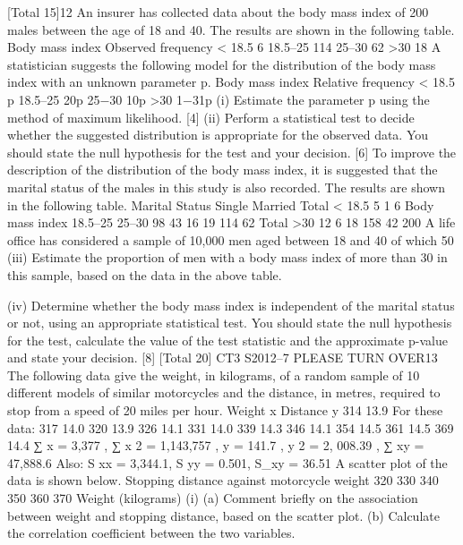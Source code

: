 \documentclass[a4paper,12pt]{article}
\begin{document}
\begin{enumerate}

[Total 15]12
An insurer has collected data about the body mass index of 200 males between the
age of 18 and 40. The results are shown in the following table.
Body mass index
Observed frequency
< 18.5
6
18.5–25
114
25–30
62
>30
18
A statistician suggests the following model for the distribution of the body mass index
with an unknown parameter p.
Body mass index
Relative frequency
< 18.5
p
18.5–25
20p
25−30
10p
>30
1−31p
(i) Estimate the parameter p using the method of maximum likelihood.
[4]
(ii) Perform a statistical test to decide whether the suggested distribution is
appropriate for the observed data. You should state the null hypothesis for the
test and your decision.
[6]
To improve the description of the distribution of the body mass index, it is suggested
that the marital status of the males in this study is also recorded. The results are
shown in the following table.
Marital Status
Single
Married
Total
< 18.5
5
1
6
Body mass index
18.5–25
25–30
98
43
16
19
114
62
Total
>30
12
6
18
158
42
200
A life office has considered a sample of 10,000 men aged between 18 and 40 of which
50%
(iii) Estimate the proportion of men with a body mass index of more than 30 in this
sample, based on the data in the above table.

(iv) Determine whether the body mass index is independent of the marital status or
not, using an appropriate statistical test. You should state the null hypothesis
for the test, calculate the value of the test statistic and the approximate
p-value and state your decision.
[8]
[Total 20]
CT3 S2012–7
PLEASE TURN OVER13
The following data give the weight, in kilograms, of a random sample of 10 different
models of similar motorcycles and the distance, in metres, required to stop from a
speed of 20 miles per hour.
Weight x
Distance y
314
13.9
For these data:
317
14.0
320
13.9
326
14.1
331
14.0
339
14.3
346
14.1
354
14.5
361
14.5
369
14.4
∑ x = 3,377 , ∑ x 2 = 1,143,757 , \sum y = 141.7 ,
\sum y 2 = 2, 008.39 , ∑ xy = 47,888.6
Also: S xx = 3,344.1, S yy = 0.501, S_{xy} = 36.51
A scatter plot of the data is shown below.
Stopping distance against motorcycle weight
320
330
340
350
360
370
Weight (kilograms)
(i)
(a) Comment briefly on the association between weight and stopping
distance, based on the scatter plot.
(b) Calculate the correlation coefficient between the two variables.


\end{enumerate}
\end{document}
